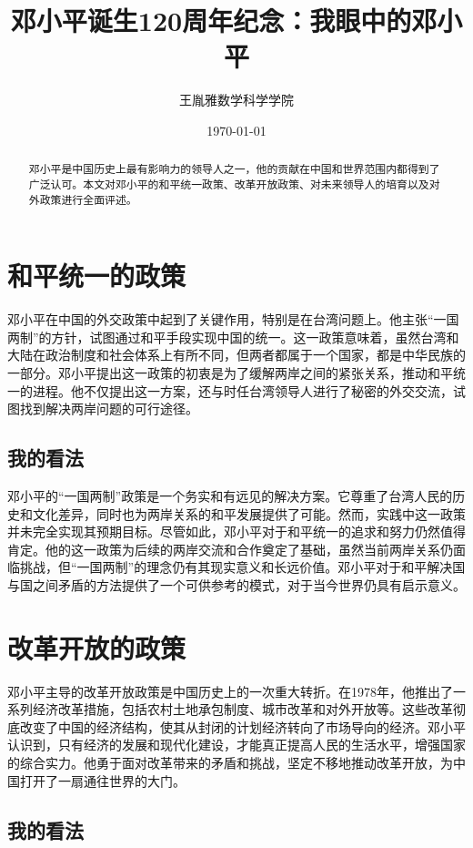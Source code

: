 \documentclass[12pt,a4paper]{article}
\title{\textbf{邓小平诞生120周年纪念：我眼中的邓小平}}
\author{王胤雅\quad 数学科学学院\quad 201911010205}
\date{\today}
\begin{document}
\small
\maketitle
\begin{abstract}
  邓小平是中国历史上最有影响力的领导人之一，他的贡献在中国和世界范围内都得到了广泛认可。本文对邓小平的和平统一政策、改革开放政策、对未来领导人的培育以及对外政策进行全面评述。
\end{abstract}

\section{和平统一的政策}

邓小平在中国的外交政策中起到了关键作用，特别是在台湾问题上。他主张“一国两制”的方针，试图通过和平手段实现中国的统一。这一政策意味着，虽然台湾和大陆在政治制度和社会体系上有所不同，但两者都属于一个国家，都是中华民族的一部分。邓小平提出这一政策的初衷是为了缓解两岸之间的紧张关系，推动和平统一的进程。他不仅提出这一方案，还与时任台湾领导人进行了秘密的外交交流，试图找到解决两岸问题的可行途径。

\subsection{我的看法}

邓小平的“一国两制”政策是一个务实和有远见的解决方案。它尊重了台湾人民的历史和文化差异，同时也为两岸关系的和平发展提供了可能。然而，实践中这一政策并未完全实现其预期目标。尽管如此，邓小平对于和平统一的追求和努力仍然值得肯定。他的这一政策为后续的两岸交流和合作奠定了基础，虽然当前两岸关系仍面临挑战，但“一国两制”的理念仍有其现实意义和长远价值。邓小平对于和平解决国与国之间矛盾的方法提供了一个可供参考的模式，对于当今世界仍具有启示意义。

\section{改革开放的政策}

邓小平主导的改革开放政策是中国历史上的一次重大转折。在1978年，他推出了一系列经济改革措施，包括农村土地承包制度、城市改革和对外开放等。这些改革彻底改变了中国的经济结构，使其从封闭的计划经济转向了市场导向的经济。邓小平认识到，只有经济的发展和现代化建设，才能真正提高人民的生活水平，增强国家的综合实力。他勇于面对改革带来的矛盾和挑战，坚定不移地推动改革开放，为中国打开了一扇通往世界的大门。

\subsection{我的看法}
\end{document}
